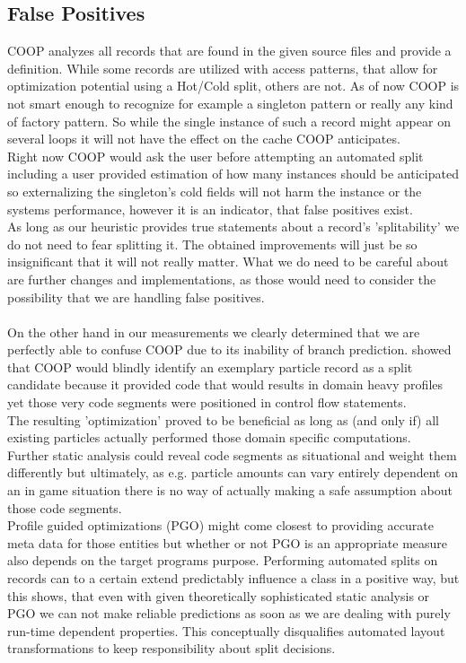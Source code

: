 \subsection{False Positives}\label{false_positives}
COOP analyzes all records that are found in the given source files and provide a definition. While some records are utilized with access patterns, that allow for optimization potential using a Hot/Cold split, others are not. As of now COOP is not smart enough to recognize for example a singleton pattern or really any kind of factory pattern. So while the single instance of such a record might appear on several loops it will not have the effect on the cache COOP anticipates.\\
Right now COOP would ask the user before attempting an automated split including a user provided estimation of how many instances should be anticipated so externalizing the singleton's cold fields will not harm the instance or the systems performance, however it is an indicator, that false positives exist.\\
As long as our heuristic provides true statements about a record's 'splitability' we do not need to fear splitting it. The obtained improvements will just be so insignificant that it will not really matter. What we do need to be careful about are further changes and implementations, as those would need to consider the possibility that we are handling false positives.\\\\
On the other hand in our measurements we clearly determined that we are perfectly able to confuse COOP due to its inability of branch prediction.  showed that COOP would blindly identify an exemplary particle record as a split candidate because it provided code that would results in domain heavy profiles yet those very code segments were positioned in control flow statements.\\
The resulting 'optimization' proved to be beneficial as long as (and only if) all existing particles actually performed those domain specific computations.\\
Further static analysis could reveal code segments as situational and weight them differently but ultimately, as e.g. particle amounts can vary entirely dependent on an in game situation there is no way of actually making a safe assumption about those code segments.\\
Profile guided optimizations (PGO) might come closest to providing accurate meta data for those entities but whether or not PGO is an appropriate measure also depends on the target programs purpose. Performing automated splits on records can to a certain extend predictably influence a class in a positive way, but this shows, that even with given theoretically sophisticated static analysis or PGO we can not make reliable predictions as soon as we are dealing with purely run-time dependent properties. This conceptually disqualifies automated layout transformations to keep responsibility about split decisions.\\\\
